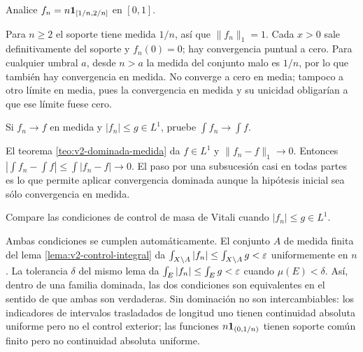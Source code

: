 \begin{ejercicio}\label{ej:v2-l17-2}
Analice $f_n=n\mathbf1_{[1/n,2/n]}$ en $[0,1]$.
\end{ejercicio}
\begin{solucion}
Para $n\ge2$ el soporte tiene medida $1/n$, así que $\|f_n\|_1=1$. Cada $x>0$ sale definitivamente del soporte y $f_n(0)=0$; hay convergencia puntual a cero. Para cualquier umbral $a$, desde $n>a$ la medida del conjunto malo es $1/n$, por lo que también hay convergencia en medida. No converge a cero en media; tampoco a otro límite en media, pues la convergencia en medida y su unicidad obligarían a que ese límite fuese cero.
\end{solucion}

\begin{ejercicio}\label{ej:v2-l17-3}
Si $f_n\to f$ en medida y $|f_n|\le g\in L^1$, pruebe $\int f_n\to\int f$.
\end{ejercicio}
\begin{solucion}
El teorema \ref{teo:v2-dominada-medida} da $f\in L^1$ y $\|f_n-f\|_1\to0$. Entonces $|\int f_n-\int f|\le\int|f_n-f|\to0$. El paso por una subsucesión casi en todas partes es lo que permite aplicar convergencia dominada aunque la hipótesis inicial sea sólo convergencia en medida.
\end{solucion}

\begin{ejercicio}\label{ej:v2-l17-4}
Compare las condiciones de control de masa de Vitali cuando $|f_n|\le g\in L^1$.
\end{ejercicio}
\begin{solucion}
Ambas condiciones se cumplen automáticamente. El conjunto $A$ de medida finita del lema \ref{lema:v2-control-integral} da $\int_{X\setminus A}|f_n|\le\int_{X\setminus A}g<\varepsilon$ uniformemente en $n$. La tolerancia $\delta$ del mismo lema da $\int_E|f_n|\le\int_Eg<\varepsilon$ cuando $\mu(E)<\delta$. Así, dentro de una familia dominada, las dos condiciones son equivalentes en el sentido de que ambas son verdaderas. Sin dominación no son intercambiables: los indicadores de intervalos trasladados de longitud uno tienen continuidad absoluta uniforme pero no el control exterior; las funciones $n\mathbf1_{(0,1/n)}$ tienen soporte común finito pero no continuidad absoluta uniforme.
\end{solucion}

